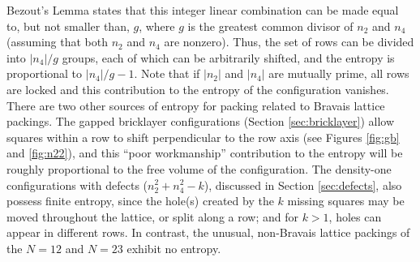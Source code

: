 \documentclass[preprint,aps]{revtex4}
\begin{document}
Bezout's Lemma \cite{Jones1998} states that this integer linear combination can be made equal to, but not smaller than, $g$, where $g$ is the greatest common divisor of $n_2$ and $n_4$ (assuming that both $n_2$ and $n_4$ are nonzero). Thus, the set of rows can be divided into $|n_4|/g$ groups, each of which can be arbitrarily shifted, and the entropy is proportional to $|n_4|/g-1$.
Note that if $|n_2|$ and $|n_4|$ are mutually prime, all rows are locked and this contribution to the entropy of the configuration vanishes. There are two other sources of entropy for packing related to Bravais lattice packings. The gapped bricklayer configurations (Section \ref{sec:bricklayer}) allow squares within a row to shift perpendicular to the row axis (see Figures \ref{fig:gb} and \ref{fig:n22}), and this ``poor workmanship'' contribution to the entropy will be roughly proportional to the free volume of the configuration.  The density-one configurations with defects ($n_2^2+n_4^2-k$), discussed in Section \ref{sec:defects}, also possess finite entropy, since the hole(s) created by the $k$ missing squares may be moved throughout the lattice, or split along a row; and for $k>1$, holes can appear in different rows.
In contrast, the unusual, non-Bravais lattice packings of the  $N=12$ and $N=23$ exhibit no entropy.
\end{document}
